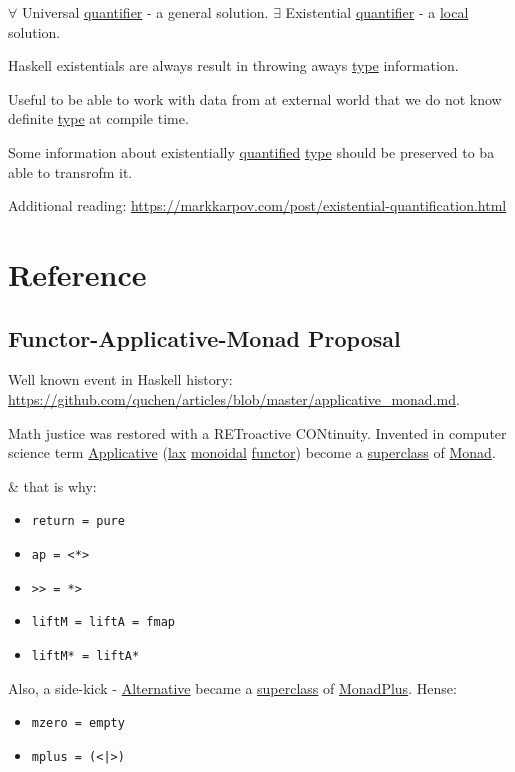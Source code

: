 \documentclass[a4paper,14pt,oneside]{book}
\begin{document}
\(\forall\) Universal \hyperref[org7aeeefd]{quantifier} - a general solution.
\(\exists\) Existential \hyperref[org7aeeefd]{quantifier} - a \hyperref[orgfbd6df6]{local} solution.

Haskell existentials are always result in throwing aways \hyperref[org02a9d3a]{type} information.

Useful to be able to work with data from at external world that we do not know definite \hyperref[org02a9d3a]{type} at compile time.

Some information about existentially \hyperref[orgf00d307]{quantified} \hyperref[org02a9d3a]{type} should be preserved to ba able to transrofm it.



Additional reading: \url{https://markkarpov.com/post/existential-quantification.html}

\part{Reference}
\label{sec:org4981fa6}

\chapter{\label{org1871468}Functor-Applicative-Monad Proposal}
\label{sec:org3a079cf}
Well known event in Haskell history: \url{https://github.com/quchen/articles/blob/master/applicative\_monad.md}.

Math justice was restored with a RETroactive CONtinuity. Invented in computer science term \hyperref[org3e108d5]{Applicative} (\hyperref[org7cf79be]{lax} \hyperref[orgbb05502]{monoidal} \hyperref[org41edcd3]{functor}) become a \hyperref[orgdbf03a7]{superclass} of \hyperref[orgc40eb8a]{Monad}.

\& that is why:
\begin{itemize}
\item \texttt{return = pure}
\item \texttt{ap = <*>}
\item \texttt{>> = *>}
\item \texttt{liftM = liftA = fmap}
\item \texttt{liftM* = liftA*}
\end{itemize}

Also, a side-kick - \hyperref[orgeb027e4]{Alternative} became a \hyperref[orgdbf03a7]{superclass} of \hyperref[org1fa170e]{MonadPlus}. Hense:
\begin{itemize}
\item \texttt{mzero = empty}
\item \texttt{mplus = (<|>)}
\end{itemize}
\end{document}
